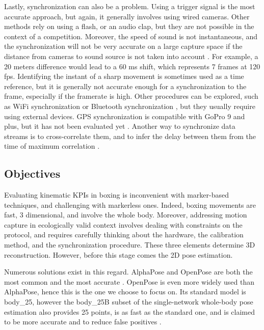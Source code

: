 Lastly, synchronization can also be a problem. Using a trigger signal is the most accurate approach, but again, it generally involves using wired cameras. Other methods rely on using a flash, or an audio clap, but they are not possible in the context of a competition. Moreover, the speed of sound is not instantaneous, and the synchronization will not be very accurate on a large capture space if the distance from cameras to sound source is not taken into account \cite{Hasler2009}. For example, a 20 meters difference would lead to a 60 ms shift, which represents 7 frames at 120 fps. Identifying the instant of a sharp movement is sometimes used as a time reference, but it is generally not accurate enough for a synchronization to the frame, especially if the framerate is high. Other procedures can be explored, such as WiFi synchronization \cite{Romanov2019} or Bluetooth synchronization \cite{Asgarian2022}, but they usually require using external devices. GPS synchronization is compatible with GoPro 9 and plus, but it has not been evaluated yet \cite{GoPro2022}. Another way to synchronize data streams is to cross-correlate them, and to infer the delay between them from the time of maximum correlation \cite{Plotz2012}. 


\subsection{Objectives}

Evaluating kinematic KPIs in boxing is inconvenient with marker-based techniques, and challenging with markerless ones. Indeed, boxing movements are fast, 3 dimensional, and involve the whole body. Moreover, addressing motion capture in ecologically valid context involves dealing with constraints on the protocol, and requires carefully thinking about the hardware, the calibration method, and the synchronization procedure. These three elements determine 3D reconstruction. However, before this stage comes the 2D pose estimation. 

Numerous solutions exist in this regard. AlphaPose \cite{Fang2017} and OpenPose \cite{Cao2019} are both the most common and the most accurate \cite{Needham2021b,Mroz2021}. OpenPose is even more widely used than AlphaPose, hence this is the one we choose to focus on. Its standard model is body\_25, however the body\_25B subset of the single-network whole-body pose estimation \cite{Hidalgo2019} also provides 25 points, is as fast as the standard one, and is claimed to be more accurate and to reduce false positives \cite{Hidalgo2019,Pagnon2021}. 


